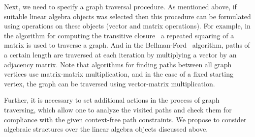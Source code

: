 Next, we need to specify a graph traversal procedure. As mentioned above, if suitable linear algebra objects was selected then this procedure can be formulated using operations on these objects (vector and matrix operations). For example, in the algorithm for computing the transitive closure~\cite{baras2010path} a repeated squaring of a matrix is used to traverse a graph. And in the Bellman-Ford~\cite{kepner2011graph} algorithm, paths of a certain length are traversed at each iteration by multiplying a vector by an adjacency matrix. Note that algorithms for finding paths between all graph vertices use matrix-matrix multiplication, and in the case of a fixed starting vertex, the graph can be traversed using vector-matrix multiplication.

Further, it is necessary to set additional actions in the process of graph traversing, which allow one to analyze the visited paths and check them for compliance with the given context-free path constraints. We propose to consider algebraic structures over the linear algebra objects discussed above.

